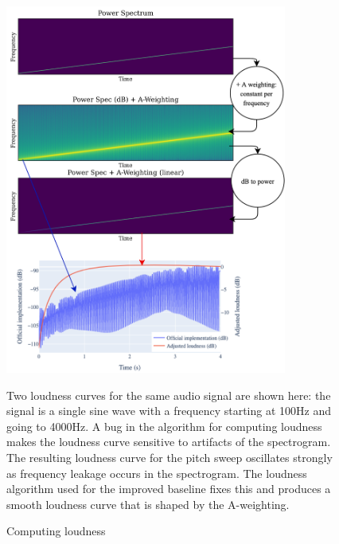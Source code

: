 \begin{figure}
    \centering
    \includegraphics[width=350px]{schema/loudness.png}
    \caption{Computing loudness}
    \small Two loudness curves for the same audio signal are shown here: the signal is a single sine wave with a frequency starting at 100Hz and going to 4000Hz. A bug in the algorithm for computing loudness makes the loudness curve sensitive to artifacts of the spectrogram. The resulting loudness curve for the pitch sweep oscillates strongly as frequency leakage occurs in the spectrogram. The loudness algorithm used for the improved baseline fixes this and produces a smooth loudness curve that is shaped by the A-weighting.
    \label{fig:loudness}
\end{figure}

